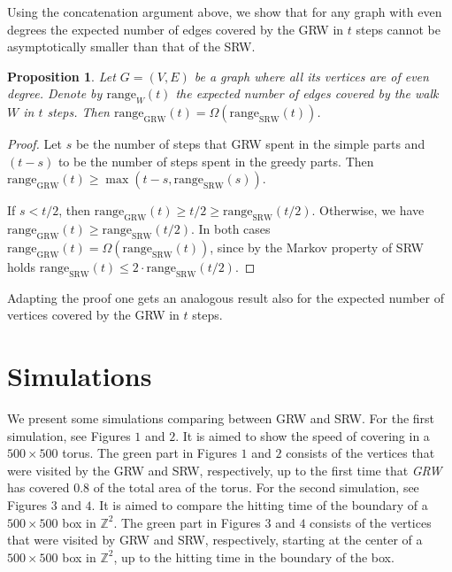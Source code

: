 \documentclass[12pt,a4paper]{article}
\newcommand{\0}{{\bf 0}}
\newcommand{\Z}{{\mathbb Z}}
\newtheorem{proposition}[theorem]{Proposition}
\newenvironment{remark}{\noindent{\bf Remark}\hspace*{1em}}{\bigskip}
\begin{document}
        Using the concatenation argument above,
        we show that for any graph with even degrees the expected number of edges covered by the GRW in $t$ steps
        cannot be asymptotically smaller than that of the SRW.

\begin{proposition}
    Let $G = (V,E)$ be a graph where all its vertices are of even degree.
    Denote by $\textrm{range}_W(t)$ the expected number of edges covered by the walk $W$ in $t$ steps.
    Then $\textrm{range}_{\textrm{GRW}}(t) = \Omega (\textrm{range}_{\textrm{SRW}}(t))$.
\end{proposition}
\begin{proof}
        Let $s$ be the number of steps that GRW spent in the simple parts
        and $(t-s)$ to be the number of steps spent in the greedy parts.
        Then $\textrm{range}_{\textrm{GRW}}(t) \geq \max(t-s, \textrm{range}_{\textrm{SRW}}(s))$.

        If $s < t/2$, then $\textrm{range}_{\textrm{GRW}}(t) \geq t/2 \geq \textrm{range}_{\textrm{SRW}}(t/2)$.
        Otherwise, we have $\textrm{range}_{\textrm{GRW}}(t) \geq \textrm{range}_{\textrm{SRW}}(t/2)$.
        In both cases $\textrm{range}_{\textrm{GRW}}(t) = \Omega (\textrm{range}_{\textrm{SRW}}(t))$,
        since by the Markov property of SRW holds $\textrm{range}_{\textrm{SRW}}(t) \leq 2 \cdot \textrm{range}_{\textrm{SRW}}(t/2)$.
\end{proof}

\begin{remark}
    Adapting the proof one gets an analogous result also for
    the expected number of vertices covered by the GRW in $t$ steps.
\end{remark}

\section{Simulations}\label{sec:simulations}
    We present some simulations comparing between GRW and SRW.
    For the first simulation, see Figures $1$ and $2$. It is aimed to show the speed of covering in a $500\times 500$ torus.
    The green part in Figures $1$ and $2$ consists of the vertices that were visited by the GRW and SRW, respectively, up to the first time that \emph{GRW} has covered $0.8$ of the total area of the torus.
    For the second simulation, see Figures $3$ and $4$. It is aimed to compare the hitting time of the boundary of a $500\times 500$ box in $\Z^2$.
    The green part in Figures $3$ and $4$ consists of the vertices that were visited by GRW and SRW, respectively, starting at the center of a $500\times 500$ box in $\Z^2$, up to the hitting time in the boundary of the box.
\end{document}
